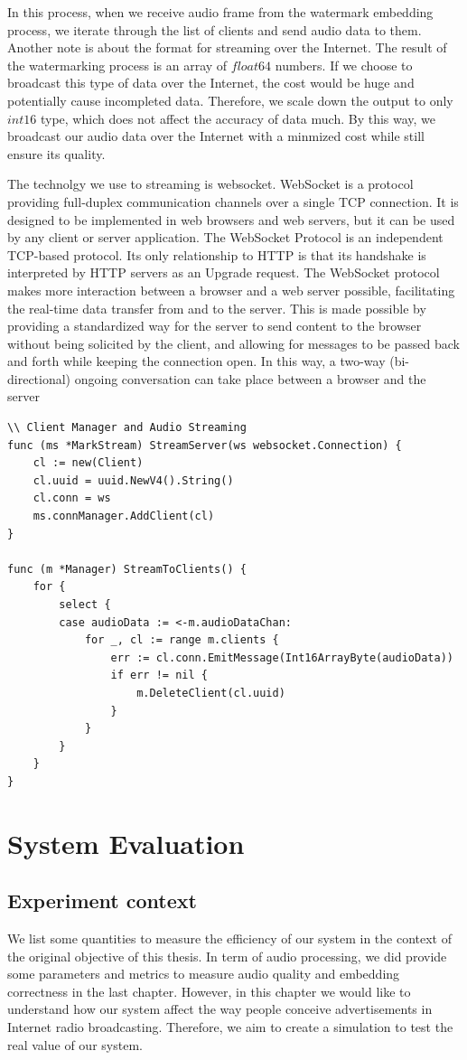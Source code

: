 In this process, when we receive audio frame from the watermark embedding process, we iterate through the list of clients and send audio data to them. Another note is about the format for streaming over the Internet. The result of the watermarking process is an array of \(float64\) numbers. If we choose to broadcast this type of data over the Internet, the cost would be huge and potentially cause incompleted data. Therefore, we scale down the output to only \(int16\) type, which does not affect the accuracy of data much. By this way, we broadcast our audio data over the Internet with a minmized cost while still ensure its quality.

The technolgy we use to streaming is websocket\cite{websocket}. WebSocket is a protocol providing full-duplex communication channels over a single TCP connection. It is designed to be implemented in web browsers and web servers, but it can be used by any client or server application. The WebSocket Protocol is an independent TCP-based protocol. Its only relationship to HTTP is that its handshake is interpreted by HTTP servers as an Upgrade request. The WebSocket protocol makes more interaction between a browser and a web server possible, facilitating the real-time data transfer from and to the server. This is made possible by providing a standardized way for the server to send content to the browser without being solicited by the client, and allowing for messages to be passed back and forth while keeping the connection open. In this way, a two-way (bi-directional) ongoing conversation can take place between a browser and the server

\begin{lstlisting}
\\ Client Manager and Audio Streaming
func (ms *MarkStream) StreamServer(ws websocket.Connection) {
	cl := new(Client)
	cl.uuid = uuid.NewV4().String()
	cl.conn = ws
	ms.connManager.AddClient(cl)
}

func (m *Manager) StreamToClients() {
	for {
		select {
		case audioData := <-m.audioDataChan:
			for _, cl := range m.clients {
				err := cl.conn.EmitMessage(Int16ArrayByte(audioData))
				if err != nil {
					m.DeleteClient(cl.uuid)
				}
			}
		}
	}
}
\end{lstlisting}

\section{System Evaluation}
\subsection{Experiment context}
We list some quantities to measure the efficiency of our system in the context of the original objective of this thesis. In term of audio processing, we did provide some parameters and metrics to measure audio quality and embedding correctness in the last chapter. However, in this chapter we would like to understand how our system affect the way people conceive advertisements in Internet radio broadcasting. Therefore, we aim to create a simulation to test the real value of our system.

